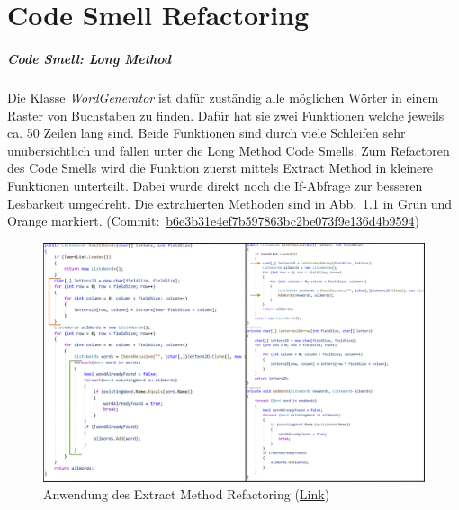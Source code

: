 \chapter{Code Smell Refactoring}

\paragraph{Code Smell: Long Method}


Die Klasse \textit{WordGenerator} ist dafür zuständig alle möglichen Wörter in einem Raster von Buchstaben zu finden. Dafür hat sie zwei Funktionen welche jeweils ca. 50 Zeilen lang sind. Beide Funktionen sind durch viele Schleifen sehr unübersichtlich und fallen unter die Long Method Code Smells. Zum Refactoren des Code Smells wird die Funktion zuerst mittels Extract Method in kleinere Funktionen unterteilt. Dabei wurde direkt noch die If-Abfrage zur besseren Lesbarkeit umgedreht. Die extrahierten Methoden sind in Abb.~\ref{Abb:ExtractMethod} in Grün und Orange markiert. (Commit:~\href{https://github.com/EinToni/Wortfinder/commit/b6e3b31e4ef7b597863bc2be073f9e136d4b9594}{b6e3b31e4ef7b597863bc2be073f9e136d4b9594})

\begin{figure}[!ht]
  \centering
  \includegraphics[width=\textwidth]{Bilder/ExtractMethod.PNG}
  \caption[Anwendung des Extract Method Refactoring]{Anwendung des Extract Method Refactoring (\href{https://github.com/EinToni/WortfinderDoku/blob/main/Bilder/ExtractMethod.png}{Link})}
  \label{Abb:ExtractMethod}
\end{figure}

